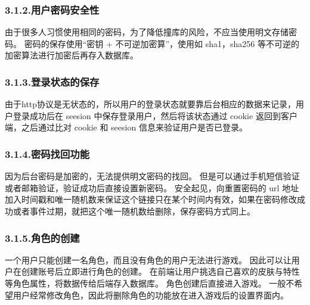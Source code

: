 \documentclass{article}
\begin{document}
\subsubsection{3.1.2.\hspace*{0.5em}用户密码安全性}\label{312}%

\noindent{}由于很多人习惯使用相同的密码，为了降低撞库的风险，不应当使用明文存储密码。 密码的保存使用“密钥 + 不可逆加密算”，使用如 sha1，sha256 等不可逆的加密算法进行加密后再存入数据库。%

\subsubsection{3.1.3.\hspace*{0.5em}登录状态的保存}\label{313}%

\noindent{}由于http协议是无状态的，所以用户的登录状态就要靠后台相应的数据来记录，用户登录成功后在 seesion 中保存登录用户，然后将该状态通过 cookie 返回到客户端，之后通过比对 cookie 和 seesion 信息来验证用户是否已登录。%

\subsubsection{3.1.4.\hspace*{0.5em}密码找回功能}\label{314}%

\noindent{}因为后台密码是加密的，无法提供明文密码的找回。 但是可以通过手机短信验证或者邮箱验证，验证成功后直接设置新密码。 安全起见，向重置密码的 url 地址加入时间戳和唯一随机数来保证这个链接只在某个时间内有效，如果在密码修改成功或者事件过期，就把这个唯一随机数给删除，保存密码方式同上。%

\subsubsection{3.1.5.\hspace*{0.5em}角色的创建}\label{315}%

\noindent{}一个用户只能创建一名角色，而且没有角色的用户无法进行游戏。 因此可以让用户在创建账号后立即进行角色的创建。 在前端让用户挑选自己喜欢的皮肤与特性等角色属性，将数据传给后端存入数据库。 角色创建后直接进入游戏。 一般不希望用户经常修改角色，因此将删除角色的功能放在进入游戏后的设置界面内。%
\end{document}
